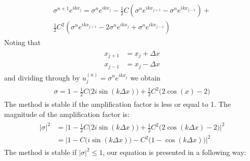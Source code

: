 	\begin{align}
		\begin{split}
			\sigma ^{n+1}e^{ikx_j} = \sigma^ne^{ikx_j} - \frac{1}{2}C(\sigma^ne^{ikx_{j+1}} - \sigma^ne^{ikx_{j-1}}) + \\ \frac{1}{2}C^2(\sigma^ne^{ikx_{j+1}} - 2\sigma ^{n}e^{ikx_j} + \sigma^ne^{ikx_{j-1}})
		\end{split}
	\end{align}
	Noting that	
	\begin{align}
		\begin{split}
			x_{j+1} &= x_j + \Delta x \\
			x_{j-1} &= x_j - \Delta x
		\end{split}
	\end{align}	
	and dividing through by $u_j^{(n)} = \sigma^ne^{ikx_j}$ we obtain
	\begin{align}
		\begin{split}
			\sigma = 1 - \frac{1}{2}C\big(2i\sin(k\Delta x)\big) + \frac{1}{2}C^2\big(2 \cos(x) - 2\big)
		\end{split}
	\end{align}
	The method is stable if the amplification factor is less or equal to 1. The magnitude of the amplification factor is:
	\begin{align}
		\begin{split}
			\label{app:for:sigmaLW}
			|\sigma|^2 &= \Big|1 - \frac{1}{2}C\big(2i\sin(k\Delta x)\big) + \frac{1}{2}C^2\big(2 \cos(k\Delta x) - 2\big)\Big|^2 \\
			&= \Big|1 - C\big(i\sin(k\Delta x)\big) - C^2\big(1- \cos(k\Delta x) \big)\Big|^2
		\end{split}
	\end{align} 
	The method is stable if $|\sigma|^2 \leq 1$, our equation is presented in a following way:	
	\begin{align}
		\begin{split}
		\end{split}
	\end{align} 	